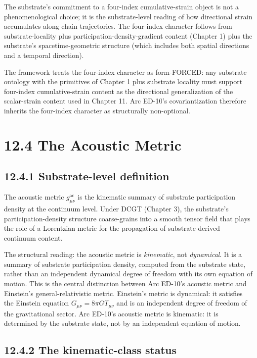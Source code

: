 \documentclass[11pt]{book}
\begin{document}
The substrate's commitment to a four-index cumulative-strain object is not a phenomenological choice; it is the substrate-level reading of how directional strain accumulates along chain trajectories. The four-index character follows from substrate-locality plus participation-density-gradient content (Chapter 1) plus the substrate's spacetime-geometric structure (which includes both spatial directions and a temporal direction).

The framework treats the four-index character as form-FORCED: any substrate ontology with the primitives of Chapter 1 plus substrate locality must support four-index cumulative-strain content as the directional generalization of the scalar-strain content used in Chapter 11. Arc ED-10's covariantization therefore inherits the four-index character as structurally non-optional.

\section{12.4 The Acoustic Metric}

\subsection{12.4.1 Substrate-level definition}

The acoustic metric $g_{\mu\nu}^\mathrm{ac}$ is the kinematic summary of substrate participation density at the continuum level. Under DCGT (Chapter 3), the substrate's participation-density structure coarse-grains into a smooth tensor field that plays the role of a Lorentzian metric for the propagation of substrate-derived continuum content.

The structural reading: the acoustic metric is \textit{kinematic}, not \textit{dynamical}. It is a summary of substrate participation density, computed from the substrate state, rather than an independent dynamical degree of freedom with its own equation of motion. This is the central distinction between Arc ED-10's acoustic metric and Einstein's general-relativistic metric. Einstein's metric is dynamical: it satisfies the Einstein equation $G_{\mu\nu} = 8\pi G T_{\mu\nu}$ and is an independent degree of freedom of the gravitational sector. Arc ED-10's acoustic metric is kinematic: it is determined by the substrate state, not by an independent equation of motion.

\subsection{12.4.2 The kinematic-class status}
\end{document}
